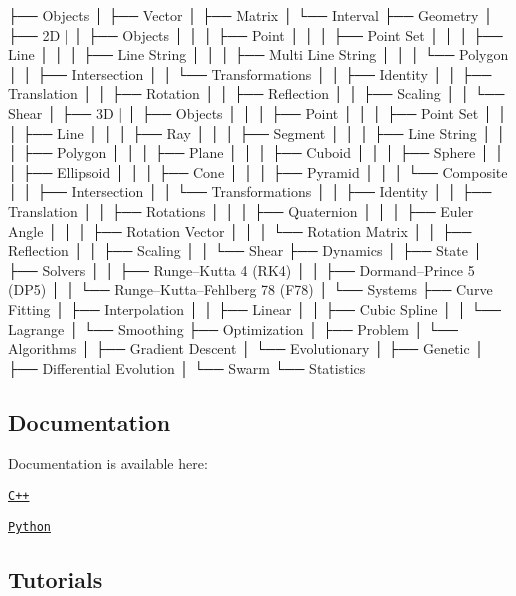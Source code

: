 \begin{DoxyCode}
├── Objects
│   ├── Vector
│   ├── Matrix
│   └── Interval
├── Geometry
│   ├── 2D
|   │   ├── Objects
│   │   │   ├── Point
│   │   │   ├── Point Set
│   │   │   ├── Line
│   │   │   ├── Line String
│   │   │   ├── Multi Line String
│   │   │   └── Polygon
│   │   ├── Intersection
│   │   └── Transformations
│   │       ├── Identity
│   │       ├── Translation
│   │       ├── Rotation
│   │       ├── Reflection
│   │       ├── Scaling
│   │       └── Shear
│   ├── 3D
|   │   ├── Objects
│   │   │   ├── Point
│   │   │   ├── Point Set
│   │   │   ├── Line
│   │   │   ├── Ray
│   │   │   ├── Segment
│   │   │   ├── Line String
│   │   │   ├── Polygon
│   │   │   ├── Plane
│   │   │   ├── Cuboid
│   │   │   ├── Sphere
│   │   │   ├── Ellipsoid
│   │   │   ├── Cone
│   │   │   ├── Pyramid
│   │   │   └── Composite
│   │   ├── Intersection
│   │   └── Transformations
│   │       ├── Identity
│   │       ├── Translation
│   │       ├── Rotations
│   │       │   ├── Quaternion
│   │       │   ├── Euler Angle
│   │       │   ├── Rotation Vector
│   │       │   └── Rotation Matrix
│   │       ├── Reflection
│   │       ├── Scaling
│   │       └── Shear
├── Dynamics
│   ├── State
│   ├── Solvers
│   │   ├── Runge–Kutta 4 (RK4)
│   │   ├── Dormand–Prince 5 (DP5)
│   │   └── Runge–Kutta–Fehlberg 78 (F78)
│   └── Systems
├── Curve Fitting
│   ├── Interpolation
│   │   ├── Linear
│   │   ├── Cubic Spline
│   │   └── Lagrange
│   └── Smoothing
├── Optimization
│   ├── Problem
│   └── Algorithms
│       ├── Gradient Descent
│       └── Evolutionary
│           ├── Genetic
│           ├── Differential Evolution
│           └── Swarm
└── Statistics
\end{DoxyCode}


\subsection*{Documentation}

Documentation is available here\+:


\begin{DoxyItemize}
\item \href{https://open-space-collective.github.io/library-io}{\tt C++}
\item \href{./bindings/python/docs}{\tt Python}
\end{DoxyItemize}

\subsection*{Tutorials}

